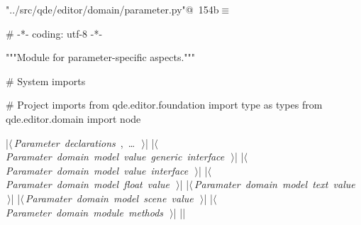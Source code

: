 \documentclass[%
    a4paper,    %
    justified,  %
    nobib,      %
    openany     %
]{tufte-book}
\begin{document}
\begin{flushleft} \small
\begin{minipage}{\linewidth}\label{scrap179}\raggedright\small
{} \verb@"../src/qde/editor/domain/parameter.py"@\nobreak\ {\footnotesize {154b}}$\equiv$
\vspace{-1ex}
\begin{pythoncode}
# -*- coding: utf-8 -*-

"""Module for parameter-specific aspects."""

# System imports

# Project imports
from qde.editor.foundation import type as types
from qde.editor.domain import node

|\hbox{$\langle\,${\itshape Parameter declarations}\nobreak\ {\footnotesize {}, \ldots\ }$\,\rangle$}|
|\hbox{$\langle\,${\itshape Paramater domain model value generic interface}\nobreak\ {\footnotesize {}}$\,\rangle$}|
|\hbox{$\langle\,${\itshape Paramater domain model value interface}\nobreak\ {\footnotesize {}}$\,\rangle$}|
|\hbox{$\langle\,${\itshape Paramater domain model float value}\nobreak\ {\footnotesize {}}$\,\rangle$}|
|\hbox{$\langle\,${\itshape Paramater domain model text value}\nobreak\ {\footnotesize {}}$\,\rangle$}|
|\hbox{$\langle\,${\itshape Paramater domain model scene value}\nobreak\ {\footnotesize {}}$\,\rangle$}|
|\hbox{$\langle\,${\itshape Parameter domain module methods}\nobreak\ {\footnotesize {}}$\,\rangle$}|
|\NWsep|
\end{pythoncode}
\vspace{1.5ex}
\footnotesize
\begin{list}{}{\setlength{\itemsep}{-\parsep}\setlength{\itemindent}{-\leftmargin}}

\item{}
\end{list}
\end{minipage}\vspace{4ex}
\end{flushleft}
\end{document}
